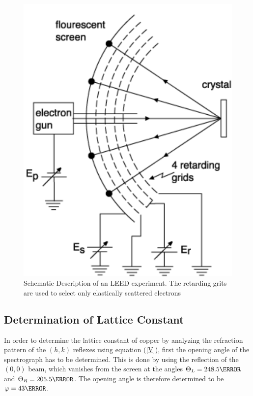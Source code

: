 \documentclass[a4paper]{scrartcl}
\numberwithin{equation}{section}
\numberwithin{figure}{section}
\numberwithin{table}{section}
\newcommand{\Formel}[1]{(\ref{#1})}
\begin{document}
\begin{figure}
  \centering
   	\includegraphics[width=0.3\linewidth]{pic/leed.pdf}

 \caption{\small Schematic Description of an LEED experiment. The retarding grits are used to select only elastically scattered electrons}
        \label{fig:leed}
\end{figure}


\subsection{Determination of Lattice Constant}
In order to determine the lattice constant of copper by analyzing the refraction pattern of the $(h,k)$ reflexes using equation \Formel{V}, first the opening angle of the spectrograph has to be determined. This is done by using the reflection of the $(0,0)$ beam, which vanishes from the screen at the angles $\Theta_L = 248.5 \degree$ and $\Theta_R=205.5 \degree$. The opening angle is therefore determined to be $\varphi=43 \degree$. 
\end{document}
